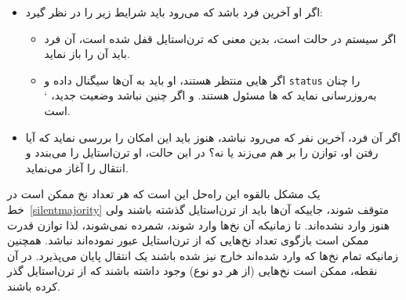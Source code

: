 \documentclass{book}
\begin{document}
\begin{itemize}

\item %
    اگر او آخرین فرد  باشد که می‌رود باید شرایط زیر را در نظر گیرد: 

    \begin{itemize}

    \item %
        اگر سیستم در حالت  است، بدین معنی که ترن‌استایل   قفل شده است، آن فرد باید آن را باز نماید. 

    \item %
    اگر هایی منتظر هستند، او باید به آن‌ها سیگنال داده و {\tt status}  را چنان به‌روزرسانی نماید که ها 
    مسئول هستند. و اگر چنین نباشد وضعیت جدید،       ` است. 

    \end{itemize}  

\item %
    اگر آن فرد، آخرین نفر   که می‌رود نباشد، هنوز باید این امکان را بررسی نماید که آیا رفتن او، توازن را بر هم می‌زند یا نه؟ 
    در این حالت، او ترن‌استایل  را می‌بندد و انتقال را آغاز می‌نماید. 

\end{itemize}

    

    
    یک مشکل بالقوه این راه‌حل این است که هر تعداد نخ‌ ممکن است در خط~\ref{silentmajority} متوقف شوند، جاییکه آن‌ها 
    باید از ترن‌استایل گذشته باشند ولی هنوز وارد نشده‌اند. تا زمانیکه آن‌ نخ‌ها وارد شوند، شمرده نمی‌شوند، لذا توازن قدرت ممکن است 
    بازگوی تعداد نخ‌هایی که از ترن‌استایل عبور نموده‌اند نباشد. همچنین زمانیکه تمام نخ‌ها که وارد شده‌اند خارج نیز شده باشند یک انتقال 
    پایان می‌پذیرد. در آن نقطه، ممکن است نخ‌هایی (از هر دو نوع) وجود داشته باشند که از ترن‌استایل گذر کرده باشند. 
    
\end{document}
